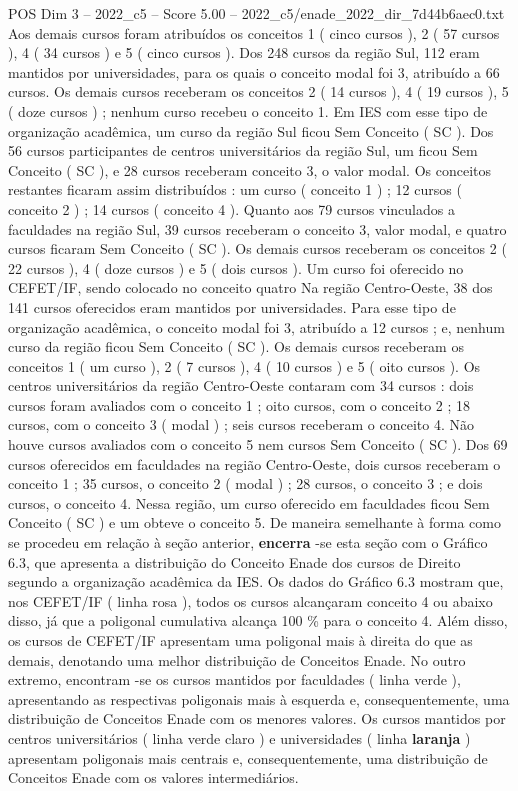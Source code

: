 \begin{textsample}{POS Dim 3 – 2022\_c5 – Score 5.00 – 2022\_c5/enade\_2022\_dir\_7d44b6aec0.txt}
Aos demais cursos foram atribuídos os conceitos 1 ( cinco cursos ), 2 ( 57 cursos ), 4 ( 34 cursos ) e 5 ( cinco cursos ).
Dos 248 cursos da região Sul, 112 eram mantidos por universidades, para os quais o conceito modal foi 3, atribuído a 66 cursos.
Os demais cursos receberam os conceitos 2 ( 14 cursos ), 4 ( 19 cursos ), 5 ( doze cursos ) ; nenhum curso recebeu o conceito 1.
Em IES com esse tipo de organização acadêmica, um curso da região Sul ficou Sem Conceito ( SC ).
Dos 56 cursos participantes de centros universitários da região Sul, um ficou Sem Conceito ( SC ), e 28 cursos receberam conceito 3, o valor modal.
Os conceitos restantes ficaram assim distribuídos : um curso ( conceito 1 ) ; 12 cursos ( conceito 2 ) ; 14 cursos ( conceito 4 ).
Quanto aos 79 cursos vinculados a faculdades na região Sul, 39 cursos receberam o conceito 3, valor modal, e quatro cursos ficaram Sem Conceito ( SC ).
Os demais cursos receberam os conceitos 2 ( 22 cursos ), 4 ( doze cursos ) e 5 ( dois cursos ).
Um curso foi oferecido no CEFET/IF, sendo colocado no conceito quatro Na região Centro-Oeste, 38 dos 141 cursos oferecidos eram mantidos por universidades.
Para esse tipo de organização acadêmica, o conceito modal foi 3, atribuído a 12 cursos ; e, nenhum curso da região ficou Sem Conceito ( SC ).
Os demais cursos receberam os conceitos 1 ( um curso ), 2 ( 7 cursos ), 4 ( 10 cursos ) e 5 ( oito cursos ).
Os centros universitários da região Centro-Oeste contaram com 34 cursos : dois cursos foram avaliados com o conceito 1 ; oito cursos, com o conceito 2 ; 18 cursos, com o conceito 3 ( modal ) ; seis cursos receberam o conceito 4.
Não houve cursos avaliados com o conceito 5 nem cursos Sem Conceito ( SC ).
Dos 69 cursos oferecidos em faculdades na região Centro-Oeste, dois cursos receberam o conceito 1 ; 35 cursos, o conceito 2 ( modal ) ; 28 cursos, o conceito 3 ; e dois cursos, o conceito 4.
Nessa região, um curso oferecido em faculdades ficou Sem Conceito ( SC ) e um obteve o conceito 5.
De maneira semelhante à forma como se procedeu em relação à seção anterior, \textbf{encerra} -se esta seção com o Gráfico 6.3, que apresenta a distribuição do Conceito Enade dos cursos de Direito segundo a organização acadêmica da IES.
Os dados do Gráfico 6.3 mostram que, nos CEFET/IF ( linha rosa ), todos os cursos alcançaram conceito 4 ou abaixo disso, já que a poligonal cumulativa alcança 100 \% para o conceito 4.
Além disso, os cursos de CEFET/IF apresentam uma poligonal mais à direita do que as demais, denotando uma melhor distribuição de Conceitos Enade.
No outro extremo, encontram -se os cursos mantidos por faculdades ( linha verde ), apresentando as respectivas poligonais mais à esquerda e, consequentemente, uma distribuição de Conceitos Enade com os menores valores.
Os cursos mantidos por centros universitários ( linha verde claro ) e universidades ( linha \textbf{laranja} ) apresentam poligonais mais centrais e, consequentemente, uma distribuição de Conceitos Enade com os valores intermediários.

\end{textsample}
